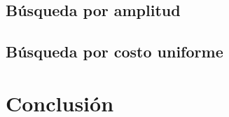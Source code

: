 \documentclass[12pt, letterpaper]{article}
\begin{document}
\subsection{Búsqueda por amplitud}

\subsection{Búsqueda por costo uniforme}
\clearpage
\section{Conclusión}
\clearpage
\end{document}
